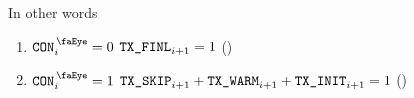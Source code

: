 In other words
\begin{enumerate}
        \item \If $\peekContext _{i} = 0$ \Then $\texttt{TX}\texttt{\_FINL} _{i + 1} = 1$ \quad (\trash)
        \item \If $\peekContext _{i} = 1$ \Then $\texttt{TX}\texttt{\_SKIP} _{i + 1} + \texttt{TX}\texttt{\_WARM} _{i + 1} + \texttt{TX}\texttt{\_INIT} _{i + 1} = 1$ \quad (\trash)
\end{enumerate}

